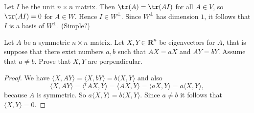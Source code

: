 {{\begin{Solution}
{            Let $I$ be the unit $n \times n$ matrix. 
            Then $\tr(A) = \tr(AI)$ for all $A \in V$, so $\tr(AI) = 0$ for $A \in W$. 
            Hence $I \in W^{\perp}$. 
            Since $W^{\perp}$ has dimension $1$, it follows that $I$ is a basis of $W^{\perp}$. 
            (Simple?) 
        }
    \end{Solution}
    \item 
    Let $A$ be a symmetric $n \times n$ matrix. 
    Let $X, Y \in \mathbf{R}^n$ be eigenvectors for $A$, that is suppose that there exist numbers $a, b$ such that $AX = aX$ and $AY = bY$. 
    Assume that $a \neq b$. 
    Prove that $X, Y$ are perpendicular. 
    \begin{Solution}
        \begin{proof}
            We have $\langle X, AY \rangle = \langle X, bY \rangle = b \langle X, Y \rangle$ and also 
            \begin{equation*}
                \langle X, AY \rangle = \langle {^{t\!}A}X, Y \rangle = \langle AX, Y \rangle = \langle aX, Y \rangle = a\langle X, Y \rangle, 
            \end{equation*}
            because $A$ is symmetric. 
            So $a\langle X, Y \rangle = b\langle X, Y \rangle$. 
            Since $a \neq b$ it follows that $\langle X, Y \rangle = 0$. 
        \end{proof}
    \end{Solution}
}}